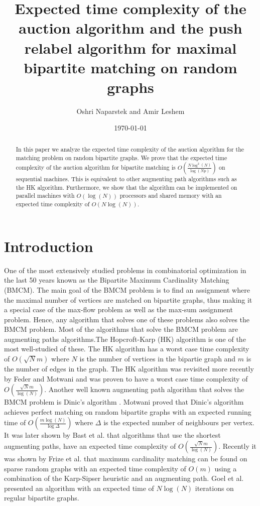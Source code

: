\documentclass[11pt,onecolumn]{article}
\begin{document}
\title{ Expected time complexity of the auction algorithm and the push relabel algorithm for maximal bipartite matching on random graphs }
\author{Oshri Naparstek and Amir Leshem}
\date{\today}
\maketitle
\begin{abstract}
In this paper we analyze the expected time complexity of the auction algorithm for the matching problem on random bipartite graphs. We prove that the expected time complexity of the auction algorithm for bipartite matching is $O\left(\frac{N\log^2(N)}{\log\left(Np\right)}\right)$ on sequential machines. This is equivalent to other augmenting path algorithms such as the HK algorithm. Furthermore, we show that the algorithm can be implemented on parallel machines with $O(\log(N))$ processors and shared memory with an expected time complexity of $O(N\log(N))$.

\end{abstract}

\section {Introduction}
 One of the most extensively studied problems in combinatorial optimization in the last 50 years known as the Bipartite Maximum Cardinality Matching (BMCM). The main goal of the BMCM problem is to find an assignment where the maximal number of vertices are matched on bipartite graphs, thus making it a special case of the max-flow problem as well as the max-sum assignment problem. Hence, any algorithm that solves one of these problems also solves the BMCM problem. Most of the algorithms that solve the BMCM problem are augmenting paths algorithms.The Hopcroft-Karp (HK) algorithm \cite{hopcroft1973n} is one of the most well-studied of these. The HK algorithm has a worst case time complexity of $O\left(\sqrt{N}m\right)$ where $N$ is the number of vertices in the bipartie graph and $m$ is the number of edges in the graph. The HK algorithm was revisited more recently by Feder and Motwani \cite{feder1991clique} and was proven to have a worst case time complexity of $O\left(\frac{\sqrt{N}m}{\log(N)}\right)$. Another well known augmenting path algorithm that solves the BMCM problem is Dinic's algorithm \cite{dinic1970algorithm}. Motwani \cite{motwani1994average} proved that Dinic's algorithm achieves perfect matching on random bipartite graphs with an expected running time of $O\left(\frac{m\log(N)}{\log\Delta}\right)$ where $\Delta$ is the expected number of neighbours per vertex. It was later shown by Bast et al. \cite{bast2006matching} that algorithms that use the shortest augmenting paths, have an expected time complexity of $O\left(\frac{\sqrt{N}m}{\log(N)}\right)$. Recently it was shown by Frize et al. \cite{chebolu2010finding} that maximum cardinality matching can be found on sparse random graphs with an expected time complexity of $O\left(m\right)$ using a combination of the Karp-Sipser heuristic and an augmenting path. Goel et al. \cite{goel2010perfect} presented an algorithm with an expected time of $N\log(N)$ iterations on regular bipartite graphs.
\end{document}
